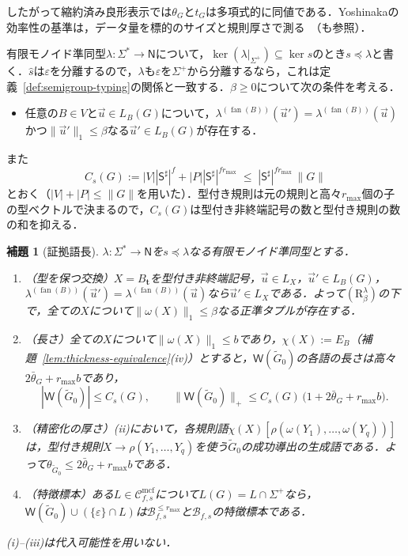 \documentclass[11pt,a4paper]{ltjsarticle}
\numberwithin{equation}{section}
\theoremstyle{plain}
\newtheorem{lemma}[theorem]{補題}
\theoremstyle{definition}
\theoremstyle{remark}
\newcommand{\Wit}{\mathsf{W}}
\newcommand{\Cmcf}[2]{\mathcal{C}^{\mathrm{mcf}}_{#1,#2}}
\newcommand{\tuple}[1]{\vec{#1}}
\newcommand{\eps}{\varepsilon}
\newcommand{\fan}{\operatorname{fan}}
\begin{document}
したがって縮約済み良形表示では$\theta_G$と$t_G$は多項式的に同値である．Yoshinakaの効率性の基準は，データ量を標的のサイズと規則厚さで測る~\cite[Definition~1]{Yoshinaka2011}（\cite{EyraudHeinzYoshinaka2016}も参照）．

有限モノイド準同型$\lambda:\Sigma^*\to\mathsf N$について，$\ker(\lambda|_{\Sigma^+})\subseteq\ker s$のとき$s\preceq\lambda$と書く．$\widehat s$は$\eps$を分離するので，$\lambda$も$\eps$を$\Sigma^+$から分離するなら，これは定義~\ref{def:semigroup-typing}の関係と一致する．$\beta\ge0$について次の条件を考える．
\begin{itemize}[leftmargin=4em]
\item[$(\mathrm R_\beta^\lambda)$] 任意の$B\in V$と$\tuple u\in L_B(G)$について，$\lambda^{(\fan(B))}(\tuple u')=\lambda^{(\fan(B))}(\tuple u)$かつ$\|\tuple u'\|_1\le\beta$なる$\tuple u'\in L_B(G)$が存在する．
\end{itemize}
また
\[
 C_s(G):=|V||\mathsf S^\sharp|^f+|P||\mathsf S^\sharp|^{fr_{\max}}
 \;\le\;|\mathsf S^\sharp|^{fr_{\max}}\,\|G\|
\]
とおく（$|V|+|P|\le\|G\|$を用いた）．型付き規則は元の規則と高々$r_{\max}$個の子の型ベクトルで決まるので，$C_s(G)$は型付き非終端記号の数と型付き規則の数の和を抑える．

\begin{lemma}[証拠語長]
\label{lem:witness-length-template}
\label{lem:type-preserving-replacement}
$\lambda:\Sigma^*\to\mathsf N$を$s\preceq\lambda$なる有限モノイド準同型とする．
\begin{enumerate}[label=\textup{(\roman*)},leftmargin=*]
\item \emph{（型を保つ交換）}$X=B_{\mathbf t}$を型付き非終端記号，$\tuple u\in L_X$，$\tuple u'\in L_B(G)$，$\lambda^{(\fan(B))}(\tuple u')=\lambda^{(\fan(B))}(\tuple u)$なら$\tuple u'\in L_X$である．よって$(\mathrm R_\beta^\lambda)$の下で，全ての$X$について$\|\omega(X)\|_1\le\beta$なる正準タプルが存在する．
\item \emph{（長さ）}全ての$X$について$\|\omega(X)\|_1\le b$であり，$\chi(X):=E_B$（補題~\ref{lem:thickness-equivalence}(iv)）とすると，$\Wit(\widetilde G_0)$の各語の長さは高々$2\bar\theta_G+r_{\max}b$であり，
\[
 |\Wit(\widetilde G_0)|\le C_s(G),\qquad
 \|\Wit(\widetilde G_0)\|_+\le C_s(G)\,\bigl(1+2\bar\theta_G+r_{\max}b\bigr).
\]
\item \emph{（精密化の厚さ）}(ii)において，各規則語$\chi(X)[\rho(\omega(Y_1),\ldots,\omega(Y_q))]$は，型付き規則$X\to\rho(Y_1,\ldots,Y_q)$を使う$\widetilde G_0$の成功導出の生成語である．よって$\theta_{\widetilde G_0}\le2\bar\theta_G+r_{\max}b$である．
\item \emph{（特徴標本）}ある$L\in\Cmcf{f}{s}$について$L(G)=L\cap\Sigma^+$なら，$\Wit(\widetilde G_0)\cup(\{\eps\}\cap L)$は$\mathcal B^{\le r_{\max}}_{f,s}$と$\mathcal B_{f,s}$の特徴標本である．
\end{enumerate}
(i)--(iii)は代入可能性を用いない．
\end{lemma}
\end{document}
